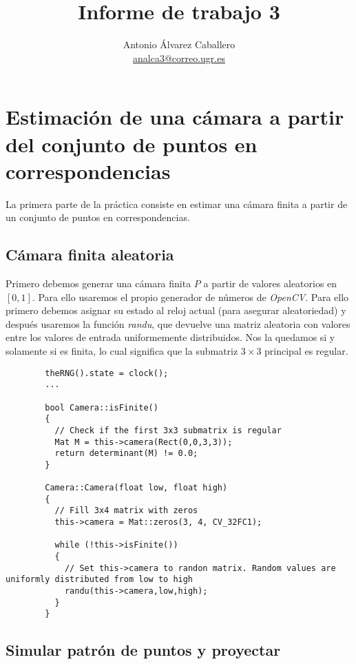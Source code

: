 \documentclass[a4paper, 11pt]{article}
\title{Informe de trabajo 3}
\author{Antonio Álvarez Caballero\\
    \href{mailto:analca3@correo.ugr.es}{analca3@correo.ugr.es}}
\date{}
\theoremstyle{definition}
\begin{document}
  \maketitle

  \section{Estimación de una cámara a partir del conjunto de puntos en correspondencias}

    La primera parte de la práctica consiste en estimar una cámara finita a partir de un
    conjunto de puntos en correspondencias.

    \subsection{Cámara finita aleatoria}

      Primero debemos generar una cámara finita $P$ a partir de valores aleatorios en $[0,1]$.
      Para ello usaremos el propio generador de números de \emph{OpenCV}. Para ello primero
      debemos asignar su estado al reloj actual (para asegurar aleatoriedad) y después
      usaremos la función \emph{randu}, que devuelve una matriz aleatoria con valores
      entre los valores de entrada uniformemente distribuidos. Nos la quedamos si y solamente si
      es finita, lo cual significa que la submatriz $3\times3$ principal es regular.

      \begin{lstlisting}
        theRNG().state = clock();
        ...

        bool Camera::isFinite()
        {
          // Check if the first 3x3 submatrix is regular
          Mat M = this->camera(Rect(0,0,3,3));
          return determinant(M) != 0.0;
        }

        Camera::Camera(float low, float high)
        {
          // Fill 3x4 matrix with zeros
          this->camera = Mat::zeros(3, 4, CV_32FC1);

          while (!this->isFinite())
          {
            // Set this->camera to randon matrix. Random values are uniformly distributed from low to high
            randu(this->camera,low,high);
          }
        }
      \end{lstlisting}

    \subsection{Simular patrón de puntos y proyectar}
\end{document}
